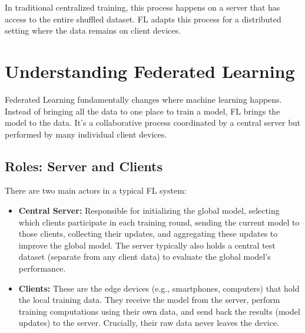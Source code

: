 \documentclass[conference]{IEEEtran}
\begin{document}
In traditional centralized training, this process happens on a server that has access to the entire shuffled dataset. FL adapts this process for a distributed setting where the data remains on client devices.

\section{Understanding Federated Learning}
Federated Learning fundamentally changes where machine learning happens. Instead of bringing all the data to one place to train a model, FL brings the model to the data. It's a collaborative process coordinated by a central server but performed by many individual client devices.

\subsection{Roles: Server and Clients}
There are two main actors in a typical FL system:
\begin{itemize}
    \item \textbf{Central Server:} Responsible for initializing the global model, selecting which clients participate in each training round, sending the current model to those clients, collecting their updates, and aggregating these updates to improve the global model. The server typically also holds a central test dataset (separate from any client data) to evaluate the global model's performance.
    \item \textbf{Clients:} These are the edge devices (e.g., smartphones, computers) that hold the local training data. They receive the model from the server, perform training computations using their own data, and send back the results (model updates) to the server. Crucially, their raw data never leaves the device.
\end{itemize}
\end{document}

